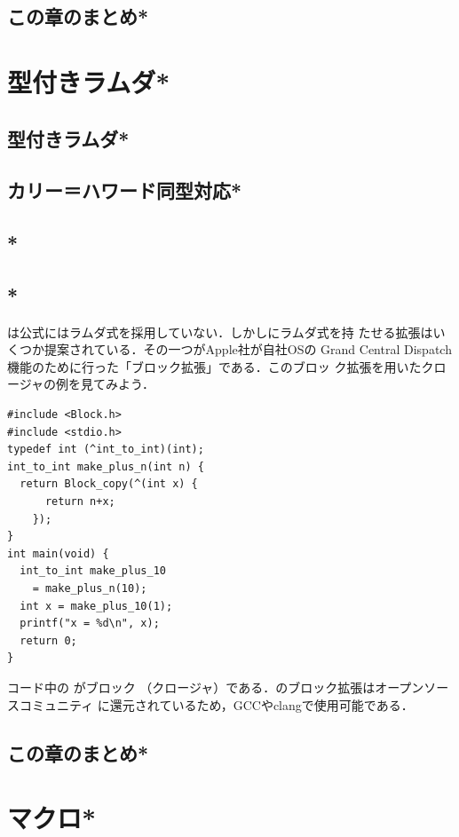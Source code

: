 \documentclass[a5paper,twoside,fleqn,draft]{jsbook}
\begin{document}
\section{この章のまとめ*}

\chapter{型付きラムダ*}
\label{ch:typed-lambda}
\section{型付きラムダ*}
\section{カリー＝ハワード同型対応*}
\section{*}
\section{*}

\clang は公式にはラムダ式を採用していない．しかし\clang にラムダ式を持
たせる拡張はいくつか提案されている．その一つがApple社が自社OSの Grand
Central Dispatch 機能のために行った「ブロック拡張」である．このブロッ
ク拡張を用いたクロージャの例を見てみよう．
\begin{ccode}
\begin{verbatim}
#include <Block.h>
#include <stdio.h>
typedef int (^int_to_int)(int);
int_to_int make_plus_n(int n) {
  return Block_copy(^(int x) {
      return n+x;
    });
}
int main(void) {
  int_to_int make_plus_10
    = make_plus_n(10);
  int x = make_plus_10(1);
  printf("x = %d\n", x);
  return 0;
}
\end{verbatim}
\end{ccode}
コード中の  がブロック
（クロージャ）である．\clang のブロック拡張はオープンソースコミュニティ
に還元されているため，GCCやclangで使用可能である．

\section{この章のまとめ*}


\chapter{マクロ*}
\label{ch:macro}
\end{document}
